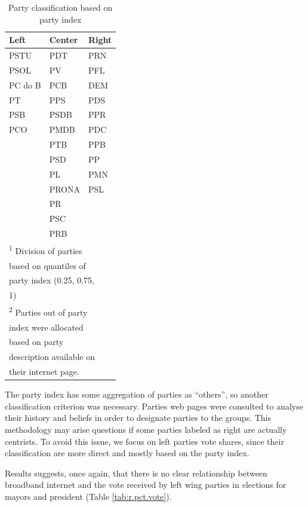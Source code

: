 \documentclass[12pt,]{article}
\begin{document}
\begin{table}[!h]

\caption{\label{tab:parties}Party classification based on party index}
\centering
\begin{tabular}{lll}
\toprule
Left & Center & Right\\
\midrule
PSTU & PDT & PRN\\
PSOL & PV & PFL\\
PC do B & PCB & DEM\\
PT & PPS & PDS\\
PSB & PSDB & PPR\\
\addlinespace
PCO & PMDB & PDC\\
 & PTB & PPB\\
 & PSD & PP\\
 & PL & PMN\\
 & PRONA & PSL\\
\addlinespace
 & PR & \\
 & PSC & \\
 & PRB & \\
\bottomrule
\multicolumn{3}{l}{\textsuperscript{1} Division of parties}\\
\multicolumn{3}{l}{based on quantiles of}\\
\multicolumn{3}{l}{party index (0.25, 0.75,}\\
\multicolumn{3}{l}{1)}\\
\multicolumn{3}{l}{\textsuperscript{2} Parties out of party}\\
\multicolumn{3}{l}{index were allocated}\\
\multicolumn{3}{l}{based on party}\\
\multicolumn{3}{l}{description available on}\\
\multicolumn{3}{l}{their internet page.}\\
\end{tabular}
\end{table}

The party index has some aggregation of parties as ``others'', so
another classification criterion was necessary. Parties web pages were
consulted to analyse their history and beliefs in order to designate
parties to the groups. This methodology may arise questions if some
parties labeled as right are actually centrists. To avoid this issue, we
focus on left parties vote shares, since their classification are more
direct and mostly based on the party index.

Results suggests, once again, that there is no clear relationship
between broadband internet and the vote received by left wing parties in
elections for mayors and president (Table \ref{tab:r.pct.vote}).
\end{document}
